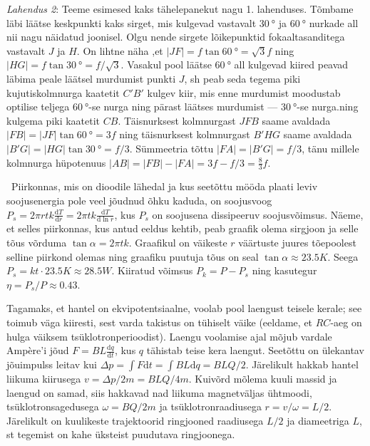 \documentclass[10pt]{article}
\begin{document}
\textit{Lahendus 2}:
Teeme esimesed kaks tähelepanekut nagu 1. lahenduses. Tõmbame läbi läätse keskpunkti kaks sirget, mis kulgevad vastavalt $\SI{30}\degree$ ja $\SI{60}\degree$ nurkade all nii nagu näidatud joonisel. Olgu nende sirgete lõikepunktid fokaaltasanditega vastavalt $J$ ja $H$. On lihtne näha ,et $|JF|=f\tan\SI{60}\degree=\sqrt 3f$ ning $|HG|=f\tan\SI{30}\degree=f/\sqrt 3$. Vasakul pool läätse $\SI{60}\degree$ all kulgevad kiired peavad läbima peale läätsel murdumist punkti $J$, sh peab seda tegema piki kujutiskolmnurga kaatetit $C'B'$ kulgev kiir, mis enne murdumist moodustab optilise teljega $\SI{60}\degree$-se nurga ning pärast läätses murdumist --- $\SI{30}\degree$-se nurga.ning kulgema piki kaatetit $CB$. Täisnurksest kolmnurgast $JFB$ saame avaldada $|FB|=|JF|\tan\SI{60}\degree=3f$ ning täisnurksest kolmnurgast $B'HG$ saame avaldada $|B'G|=|HG|\tan\SI{30}\degree=f/3$. Sümmeetria tõttu $|FA|=|B'G|=f/3$, tänu millele kolmnurga hüpotenuus $|AB|=|FB|-|FA|=3f-f/3=\frac 83f$.
\probend
\bigskip


\solu
\
Piirkonnas, mis on dioodile lähedal ja kus seetõttu mööda plaati leviv soojusenergia pole veel jõudnud õhku kaduda, on soojusvoog $P_s=2\pi rtk \frac{\mathrm d T}{\mathrm d r}=2\pi tk \frac{\mathrm d T}{\mathrm d \ln r}$, kus $P_s$ on soojusena dissipeeruv soojusvõimsus. Näeme, et selles piirkonnas, kus antud eeldus kehtib, peab graafik olema sirgjoon ja selle tõus võrduma $\tan\alpha=2\pi tk$. Graafikul on väikeste $r$ väärtuste juures tõepoolest selline piirkond olemas ning graafiku puutuja tõus on seal $\tan\alpha\approx\SI{23.5}K$. Seega $P_s=kt\cdot \SI{23.5}K\approx \SI{28.5}W$. Kiiratud võimsus $P_k=P-P_s$ ning kasutegur $\eta=P_s/P\approx 0.43$.
\probend
\bigskip


\solu
Tagamaks, et hantel on ekvipotentsiaalne, voolab pool laengust teisele kerale; see toimub väga kiiresti, sest varda takistus on tühiselt väike (eeldame, et $RC$-aeg on hulga väiksem tsüklotronperioodist). Laengu voolamise ajal mõjub vardale Ampère'i jõud $F=BL\frac {\mathrm d q}{\mathrm dt}$, kus $q$ tähistab teise kera laengut. Seetõttu on ülekantav jõuimpulss leitav kui $\Delta p=\int F\mathrm dt=\int BL\mathrm dq = BLQ/2$. Järelikult hakkab hantel liikuma kiirusega $v=\Delta p/2m=BLQ/4m$. Kuivõrd mõlema kuuli massid ja laengud on samad, siis hakkavad nad liikuma magnetväljas ühtmoodi, tsüklotronsagedusega $\omega=BQ/2m$ ja tsüklotronraadiusega $r=v/\omega=L/2$. Järelikult on kuulikeste trajektoorid ringjooned raadiusega $L/2$ ja diameetriga $L$, st tegemist on kahe üksteist puudutava ringjoonega.
\probend
\bigskip
\end{document}
